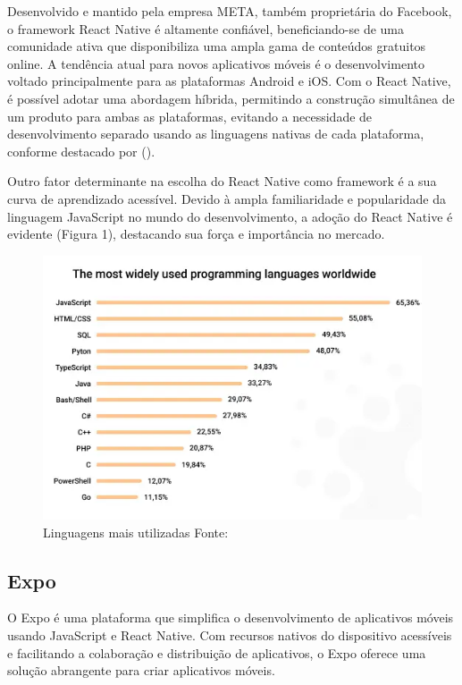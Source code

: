 Desenvolvido e mantido pela empresa META, também proprietária do Facebook, o framework React Native é altamente confiável, beneficiando-se de uma comunidade ativa 
que disponibiliza uma ampla gama de conteúdos gratuitos online. A tendência atual para novos aplicativos móveis é o desenvolvimento voltado principalmente para as 
plataformas Android e iOS. Com o React Native, é possível adotar uma abordagem híbrida, permitindo a construção simultânea de um produto para ambas as plataformas, 
evitando a necessidade de desenvolvimento separado usando as linguagens nativas de cada plataforma, conforme destacado por (\textcite{Sabino}).

Outro fator determinante na escolha do React Native como framework é a sua curva de aprendizado acessível. Devido à ampla familiaridade e popularidade da linguagem 
JavaScript no mundo do desenvolvimento, a adoção do React Native é evidente (Figura 1), destacando sua força e importância no mercado.

\clearpage
\begin{figure}[htb]
	\caption{\label{fig:Fig_1}Linguagens mais utilizadas Fonte: \cite{Softermii}}
	\begin{center}
		\includegraphics{images/top.png}
	\end{center}
\end{figure}

\subsection{Expo}
O Expo é uma plataforma que simplifica o desenvolvimento de aplicativos móveis usando JavaScript e React Native. Com recursos nativos do dispositivo acessíveis e facilitando a colaboração e distribuição de aplicativos, o Expo oferece uma solução abrangente para criar aplicativos móveis.

